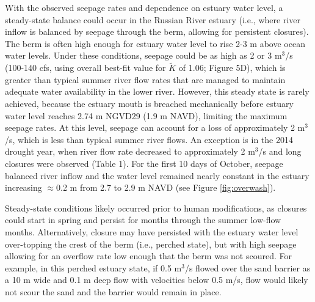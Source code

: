 \documentclass[preprint,12pt,authoryear]{elsarticle}
\makeatletter
\providecommand{\DIFaddtex}[1]{{\protect\color{blue}\uwave{#1}}} %
\providecommand{\DIFdeltex}[1]{{\protect\color{red}\sout{#1}}} %
\providecommand{\DIFaddbegin}{} %
\providecommand{\DIFaddend}{} %
\providecommand{\DIFdelbegin}{} %
\providecommand{\DIFdelend}{} %
\providecommand{\DIFadd}[1]{\texorpdfstring{\DIFaddtex{#1}}{#1}} %
\providecommand{\DIFdel}[1]{\texorpdfstring{\DIFdeltex{#1}}{}} %
\newcommand{\DIFscaledelfig}{0.5}
\newlength{\DIFdelgraphicswidth} %
\newlength{\DIFdelgraphicsheight} %
\newcommand{\DIFaddincludegraphics}[2][]{{\color{blue}\fbox{\DIFOincludegraphics[#1]{#2}}}} %
\newcommand{\DIFdelincludegraphics}[2][]{%
\sbox{\DIFdelgraphicsbox}{\DIFOincludegraphics[#1]{#2}}%
\settoboxwidth{\DIFdelgraphicswidth}{\DIFdelgraphicsbox} %
\settoboxtotalheight{\DIFdelgraphicsheight}{\DIFdelgraphicsbox} %
\scalebox{\DIFscaledelfig}{%
\parbox[b]{\DIFdelgraphicswidth}{\usebox{\DIFdelgraphicsbox}\\[-\baselineskip] \rule{\DIFdelgraphicswidth}{0em}}\llap{\resizebox{\DIFdelgraphicswidth}{\DIFdelgraphicsheight}{%
\setlength{\unitlength}{\DIFdelgraphicswidth}%
\begin{picture}(1,1)%
\thicklines\linethickness{2pt} %
{\color[rgb]{1,0,0}\put(0,0){\framebox(1,1){}}}%
{\color[rgb]{1,0,0}\put(0,0){\line( 1,1){1}}}%
{\color[rgb]{1,0,0}\put(0,1){\line(1,-1){1}}}%
\end{picture}%
}\hspace*{3pt}}} %
} %
\DeclareRobustCommand{\DIFaddbegin}{\DIFOaddbegin \let\includegraphics\DIFaddincludegraphics} %
\DeclareRobustCommand{\DIFaddend}{\DIFOaddend \let\includegraphics\DIFOincludegraphics} %
\DeclareRobustCommand{\DIFdelbegin}{\DIFOdelbegin \let\includegraphics\DIFdelincludegraphics} %
\DeclareRobustCommand{\DIFdelend}{\DIFOaddend \let\includegraphics\DIFOincludegraphics} %
\let\sout@orig\sout %
\renewcommand{\sout}[1]{\ifmmode\text{\sout@orig{\ensuremath{#1}}}\else\sout@orig{#1}\fi} %
\makeatother
\begin{document}
With the observed seepage rates and dependence on estuary water level, a steady-state balance could occur in the Russian River estuary (i.e., where river inflow is balanced by seepage through the berm, allowing for persistent closures). The berm is often high enough for estuary water level to rise 2-3 m above ocean water levels. Under these conditions, seepage could be as high as 2 or 3 m$^3$/s (100-140 cfs, using overall best-fit value for \DIFdelbegin \DIFdel{$\tilde K$ }\DIFdelend \DIFaddbegin \DIFadd{$C_L$ }\DIFaddend of 1.06; Figure 5D), which is greater than typical summer river flow rates that are managed to maintain adequate water availability in the lower river.
However, this steady state is rarely achieved, because 
the estuary mouth is breached mechanically before estuary water level reaches 2.74 m NGVD29 (1.9 m NAVD), limiting the maximum seepage rates.
At this level, seepage can account for a loss of approximately 2 m$^3$/s, which is less than typical summer river flows. An exception is in the 2014 drought year, when river flow rate decreased to  approximately 2 m$^3$/s and long closures were observed (Table 1). For the first 10 days of October, seepage balanced river inflow and the water level remained nearly constant in the estuary increasing $\approx$0.2 m from 2.7 to 2.9 m NAVD (see Figure \ref{fig:overwash}). 

Steady-state conditions likely occurred prior to human modifications, as closures could start in spring and persist for months through the summer low-flow months. Alternatively, closure may have persisted with the estuary water level over-topping the crest of the berm (i.e., perched state), but with high seepage allowing for an overflow rate low enough that the berm was not scoured. For example, in this perched estuary state, if 0.5 m$^3$/s flowed over the sand barrier as a 10 m wide and 0.1 m deep flow with velocities below 0.5 m/s, flow would likely  not scour the sand and the barrier would remain in place. 
\end{document}
